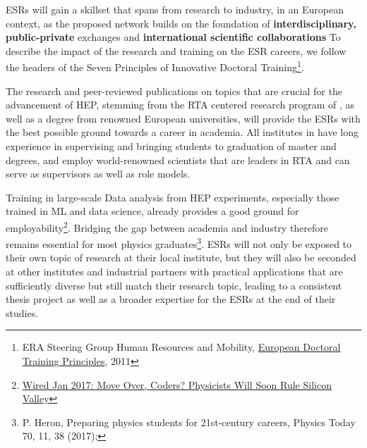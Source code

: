 
ESRs will gain a skillset that spans from research to industry,
in an European context, as the proposed network builds on the foundation of
\textbf{interdisciplinary, public-private} exchanges
and \textbf{international scientific collaborations}
To describe the impact of the research and training on the ESR careers, we follow the headers of the Seven Principles of Innovative Doctoral Training\footnote{ERA Steering Group Human Resources and Mobility, \href{https://euraxess.ec.europa.eu/belgium/jobs-funding/doctoral-training-principles}{European Doctoral Training Principles}, 2011}. 

\noindent\color{blue}{Research excellence, attractive institutional environment. }\color{black}
The research and peer-reviewed publications on topics that are crucial
for the advancement of HEP, stemming from the RTA centered research program of \acronym,
as well as a \phd degree from renowned European universities, 
will provide the ESRs with the best possible ground towards a career in academia. 
All institutes in \acronym have long
experience in supervising and bringing students to graduation of master and \phd degrees, 
and employ world-renowned scientists that are leaders in RTA and 
can serve as supervisors as well as role models. 

\noindent\color{blue}{Interdisciplinary Research Options, Exposure to Industry and other relevant employment sectors. }\color{black}
Training in large-scale Data analysis from HEP experiments, especially those trained in ML and data science, already provides a good ground for employability\footnote{
\href{https://www.wired.com/2017/01/move-coders-physicists-will-soon-rule-silicon-valley/}{Wired Jan 2017: Move Over, Coders? Physicists Will Soon Rule Silicon Valley}}.
Bridging the gap between academia and industry therefore remains essential for most 
physics graduates\footnote{P. Heron, Preparing physics students for
21st-century careers, Physics Today 70, 11, 38 (2017);}. 
ESRs will not only be exposed to their
own topic of research at their local institute, but they will 
also be seconded at other institutes and industrial partners with practical
applications that are sufficiently diverse but still match
their research topic, leading to a consistent thesis project as well
as a broader expertise for the ESRs at the end of their studies.


